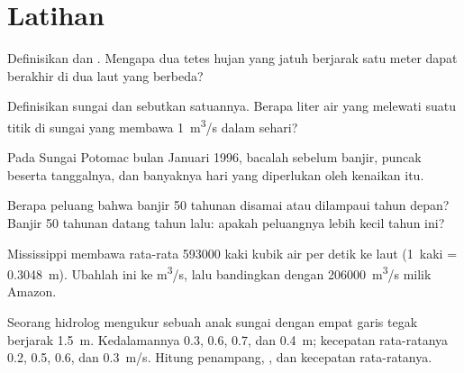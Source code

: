 \section{Latihan}

\begin{exercise}[$\star$]\label{exo:g10:drainage-basins:1}
Definisikan  dan . Mengapa dua tetes
hujan yang jatuh berjarak satu meter dapat berakhir di dua laut yang berbeda?
\end{exercise}

\begin{exercise}[$\star$]\label{exo:g10:drainage-basins:2}
Definisikan  sungai dan sebutkan satuannya. Berapa liter air yang
melewati suatu titik di sungai yang membawa \qty{1}{m^3/s} dalam sehari?
\end{exercise}

\begin{exercise}[$\star$]\label{exo:g10:drainage-basins:3}
Pada  Sungai Potomac bulan Januari 1996, bacalah 
sebelum banjir,  puncak beserta tanggalnya, dan banyaknya hari yang
diperlukan oleh kenaikan itu.
\end{exercise}

\begin{exercise}[$\star$]\label{exo:g10:drainage-basins:4}
Berapa peluang bahwa banjir \num{50} tahunan disamai atau dilampaui tahun
depan? Banjir \num{50} tahunan datang tahun lalu: apakah peluangnya lebih
kecil tahun ini?
\end{exercise}

\begin{exercise}[$\star$]\label{exo:g10:drainage-basins:5}
Mississippi membawa rata-rata \num{593000} kaki kubik air per detik ke laut
(\num{1}~kaki = \qty{0.3048}{m}). Ubahlah  ini ke \unit{m^3/s}, lalu
bandingkan dengan \qty{206000}{m^3/s} milik Amazon.
\end{exercise}

\begin{exercise}[$\star\star$]\label{exo:g10:drainage-basins:6}
Seorang hidrolog mengukur  sebuah anak sungai dengan empat garis tegak
berjarak \qty{1.5}{m}. Kedalamannya \num{0.3}, \num{0.6}, \num{0.7}, dan
\qty{0.4}{m}; kecepatan rata-ratanya \num{0.2}, \num{0.5}, \num{0.6}, dan
\qty{0.3}{m/s}. Hitung penampang, , dan kecepatan rata-ratanya.
\end{exercise}

